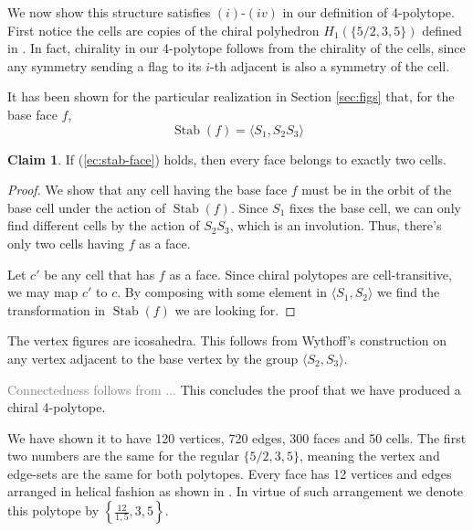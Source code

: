\documentclass[spanish]{article}
\theoremstyle{definition}
\newtheorem*{claim}{Claim}
\DeclareMathOperator{\Stab}{Stab}
\begin{document}
	We now show this structure satisfies $(i)$-$(iv)$ in our definition of 4-polytope. First notice the cells are copies of the chiral polyhedron $H_1(\{5/2,3,5\})$ defined in \cite{petcox}. In fact, chirality in our 4-polytope follows from the chirality of the cells, since any symmetry sending a flag to its $i$-th adjacent is also a symmetry of the cell.
	
	It has been shown for the particular realization in Section \ref{sec:figs} that, for the base face $f$,
	\begin{equation}\label{ec:stab-face}
		\Stab(f)=\langle S_1,S_2S_3\rangle
	\end{equation}
	\begin{claim}
		If (\ref{ec:stab-face}) holds, then every face belongs to exactly two cells.
	\end{claim}
	\begin{proof}
		We show that any cell having the base face $f$ must be in the orbit of the base cell under the action of $\Stab(f)$. Since $S_1$ fixes the base cell, we can only find different cells by the action of $S_2S_3$, which is an involution. Thus, there's only two cells having $f$ as a face.
		
		Let $c'$ be any cell that has $f$ as a face. Since chiral polytopes are cell-transitive, we may map $c'$ to $c$. By composing with some element in $\langle S_1,S_2\rangle$ we find the transformation in $\Stab(f)$ we are looking for.
	\end{proof}
	
	The vertex figures are icosahedra. This follows from Wythoff's construction on any vertex adjacent to the base vertex by the group $\langle S_2,S_3\rangle$.
	
	\textcolor{gray}{Connectedness follows from ...} This concludes the proof that we have produced a chiral 4-polytope.
	
	We have shown it to have  120 vertices, 720 edges, 300 faces and 50 cells. The first two numbers are the same for the regular $\{5/2,3,5\}$, meaning the vertex and edge-sets are the same for both polytopes. Every face has 12 vertices and edges arranged in helical fashion as shown in \cite{petcox}. In virtue of such arrangement we denote this polytope by $\left\{\frac{12}{1,5},3,5\right\}$.
	
\end{document}
